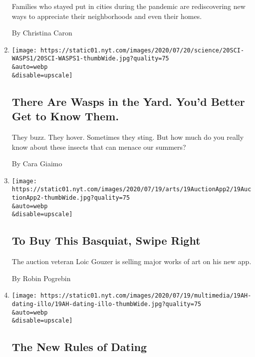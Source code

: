 \begin{enumerate}
  Families who stayed put in cities during the pandemic are
  rediscovering new ways to appreciate their neighborhoods and even
  their homes.

  By Christina Caron
\item
  \href{/article/paper-wasps-yellowjackets.html}{}

  \texttt{[image: https://static01.nyt.com/images/2020/07/20/science/20SCI-WASPS1/20SCI-WASPS1-thumbWide.jpg?quality=75\\\&auto=webp\\\&disable=upscale]}

  \hypertarget{there-are-wasps-in-the-yard-youd-better-get-to-know-them}{%
  \subsection{There Are Wasps in the Yard. You'd Better Get to Know
  Them.}\label{there-are-wasps-in-the-yard-youd-better-get-to-know-them}}

  They buzz. They hover. Sometimes they sting. But how much do you
  really know about these insects that can menace our summers?

  By Cara Giaimo
\item
  \href{/2020/07/19/arts/design/swipe-right-buy-basquiat.html}{}

  \texttt{[image: https://static01.nyt.com/images/2020/07/19/arts/19AuctionApp2/19AuctionApp2-thumbWide.jpg?quality=75\\\&auto=webp\\\&disable=upscale]}

  \hypertarget{to-buy-this-basquiat-swipe-right}{%
  \subsection{To Buy This Basquiat, Swipe
  Right}\label{to-buy-this-basquiat-swipe-right}}

  The auction veteran Loic Gouzer is selling major works of art on his
  new app.

  By Robin Pogrebin
\item
  \href{/2020/07/18/at-home/coronavirus-pandemic-dating.html}{}

  \texttt{[image: https://static01.nyt.com/images/2020/07/19/multimedia/19AH-dating-illo/19AH-dating-illo-thumbWide.jpg?quality=75\\\&auto=webp\\\&disable=upscale]}

  \hypertarget{the-new-rules-of-dating}{%
  \subsection{The New Rules of Dating}\label{the-new-rules-of-dating}}


\end{enumerate}
